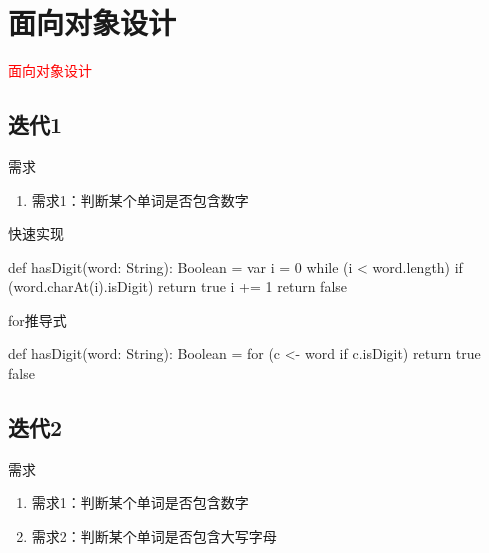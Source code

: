\section{面向对象设计}
\label{sec:oodesign}

\begin{frame}
  \begin{center}
    \Huge{\textcolor{red}{面向对象设计}}
  \end{center}
\end{frame}

\subsection{迭代1}

\begin{frame}{需求}
  \begin{block}{}
    \begin{enumerate}
      \item<alert@1-> 需求1：判断某个单词是否包含数字
    \end{enumerate}
  \end{block}
\end{frame}

\begin{frame}[fragile]{快速实现}
  \begin{scala}
def hasDigit(word: String): Boolean = {
  var i = 0
  while (i < word.length) {
    if (word.charAt(i).isDigit) 
      return true
    i += 1
  }
  return false
}
  \end{scala}
\end{frame}

\begin{frame}[fragile]{for推导式}
  \begin{scala}
def hasDigit(word: String): Boolean = {
  for (c <- word if c.isDigit) 
    return true
  false
}
  \end{scala}
\end{frame}

\subsection{迭代2}

\begin{frame}{需求}
  \begin{block}{}
    \begin{enumerate}
    \item \alert{需求1}：判断某个单词是否包含数字
    \item<alert@1-> 需求2：判断某个单词是否包含大写字母
    \end{enumerate}
  \end{block}
\end{frame}

